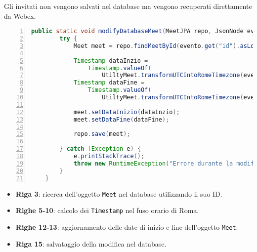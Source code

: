 Gli invitati non vengono salvati nel database ma vengono recuperati direttamente da Webex.
\begin{lstlisting}[language=java, frame=lines, basicstyle=\ttfamily\scriptsize, numbers=left, 
	caption={modifica meet a database}, label={modifica_meet_a_database}]
    public static void modifyDatabaseMeet(MeetJPA repo, JsonNode evento) {
		try {
			Meet meet = repo.findMeetById(evento.get("id").asLong());

			Timestamp dataInzio = 
                Timestamp.valueOf(
					UtiltyMeet.transformUTCIntoRomeTimezone(evento.get("start").asText()));
			Timestamp dataFine = 
                Timestamp.valueOf(
					UtiltyMeet.transformUTCIntoRomeTimezone(evento.get("end").asText()));

			meet.setDataInizio(dataInzio);
			meet.setDataFine(dataFine);

			repo.save(meet);

		} catch (Exception e) {
			e.printStackTrace();
			throw new RuntimeException("Errore durante la modifica del meeting a database", e);
		}
	}
\end{lstlisting}
\begin{itemize}
    \item \textbf{Riga 3}: ricerca dell'oggetto \texttt{Meet} nel database utilizzando il suo ID.
    \item \textbf{Righe 5-10}: calcolo dei \texttt{Timestamp} nel fuso orario di Roma.
    \item \textbf{Righe 12-13}: aggiornamento delle date di inizio e fine dell'oggetto \texttt{Meet}.
    \item \textbf{Riga 15}: salvataggio della modifica nel database.
\end{itemize}